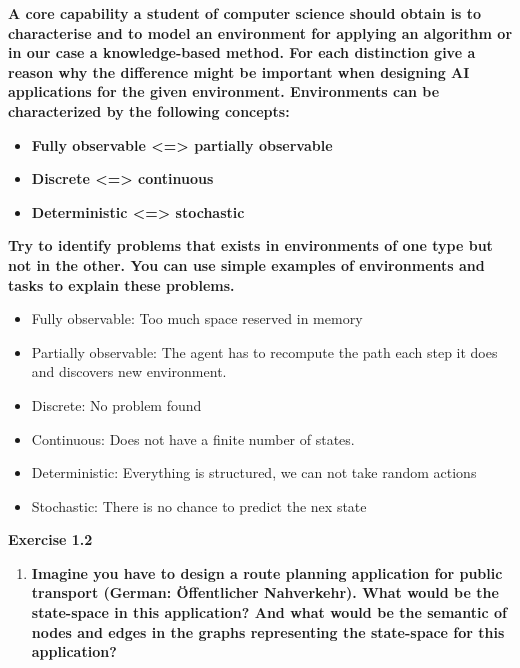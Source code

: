 \documentclass[paper=a4, fontsize=11pt]{scrartcl} %
\numberwithin{equation}{section} %
\numberwithin{figure}{section} %
\numberwithin{table}{section} %
\begin{document}
\large{ \textbf{A core capability a student of computer science should obtain is to characterise 
and to model an environment for applying an algorithm or in our case a knowledge-based method.
For each distinction give a reason why the difference might be important when designing AI applications for the given environment.
Environments can be characterized by the following concepts:}

	\begin{itemize}
		\item \large{ \textbf{Fully observable <=> partially observable}}
	 	\item \large{ \textbf{Discrete <=> continuous}}
	 	\item \large{ \textbf{Deterministic <=> stochastic}}
	\end{itemize}

\large{ \textbf{Try to identify problems that exists in environments of one type but not in the other. You can use simple examples of environments and tasks to explain these problems.}}
\newline

\begin{itemize}
\item Fully observable: Too much space reserved in memory 
\item Partially observable: The agent has to recompute the path each step it does and discovers new environment.

\item Discrete: No problem found  
\item Continuous: Does not have a finite number of states.


\item Deterministic: Everything is structured, we can not take random actions \\      
\item Stochastic: There is no chance to predict the nex state 
\end{itemize}


\huge{ \textbf{Exercise 1.2}}\\

\begin{enumerate}
\item 
\large{ \textbf{Imagine you have to design a route planning application for public transport (German: Öffentlicher Nahverkehr). What would be the state-space in this application? And what would be the semantic of nodes and edges in the graphs representing the state-space for this application?}}\\


\end{enumerate}}
\end{document}
